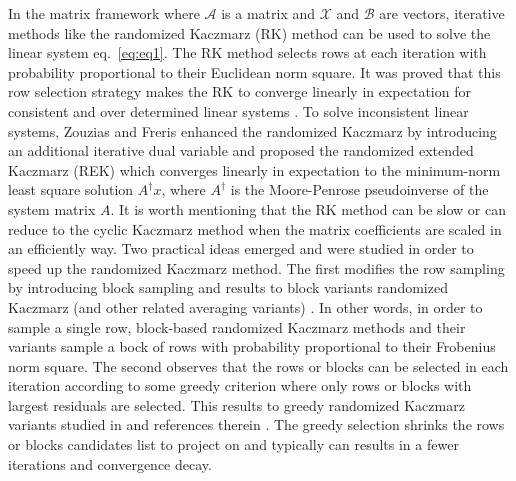 \documentclass[11pt]{article}
\def\fm#1{\mathcal{#1}}
\begin{document}
In the matrix framework where $\fm A$ is a matrix and $\fm X$ and $\fm B$ are vectors,  iterative methods like the randomized Kaczmarz (RK) method can be  used to solve  the linear system  eq.~\eqref{eq:eq1}.
The RK method selects rows  at each iteration with probability proportional to their Euclidean norm square. It was proved that this row selection strategy  makes the RK to converge linearly in expectation  for consistent and over determined linear systems \cite{strohmer2009}.  To solve inconsistent linear systems, Zouzias and Freris \cite{zouzias2013rando} enhanced the randomized Kaczmarz by introducing an additional iterative dual variable and proposed  the randomized extended Kaczmarz (REK) which  converges linearly in expectation to  the minimum-norm least square solution $A^\dagger x$, where $A^\dagger $ is the Moore-Penrose pseudoinverse of the system matrix $A$. 
It is worth mentioning that the RK method can be slow or can reduce to the cyclic Kaczmarz method when the matrix  coefficients are scaled  in an efficiently way. %
Two practical ideas emerged and were studied in order to speed up the randomized Kaczmarz method. The first modifies the  row sampling by introducing block sampling and results to block variants randomized Kaczmarz (and  other related averaging variants) \cite{necoara2019faste, du2020rando,tondji2023faster}. In other words, in order to sample a single row, block-based randomized Kaczmarz methods and their variants sample a bock of rows with probability proportional to their Frobenius norm square. The second observes that the rows or blocks can be selected in each iteration according to some greedy  criterion  where only rows or blocks with largest residuals are selected. This  results to greedy randomized Kaczmarz  variants studied in \cite{bai2018greed,bai2019greed,bai2021greed} and references therein . The greedy selection shrinks the rows or blocks candidates  list to project on and typically  can results in a fewer iterations and convergence decay. 
\end{document}
